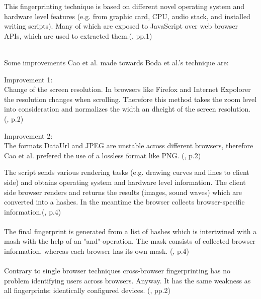 This fingerprinting technique is based on different novel operating system and hardware level features (e.g. from graphic card, CPU, audio stack, and installed writing scripts). Many of which are exposed to JavaScript over web browser APIs, which are used to extracted them.(\textcite{Cao17}, pp.1)\\\\

Some improvements Cao et al. made towards Boda et al.'s technique are:
\begin{tcolorbox}
	Improvement 1:\\
	Change of the screen resolution. In browsers like Firefox and Internet Expolorer the resolution changes when scrolling. Therefore this method takes the zoom level into consideration and normalizes the width an dheight of the screen resolution. (\textcite{Cao17}, p.2)
\end{tcolorbox}
\begin{tcolorbox}
	Improvement 2:\\
	The formats DataUrl and JPEG are unstable across different browsers, therefore Cao et al. prefered the use of a lossless format like PNG. (\textcite{Cao17}, p.2)
\end{tcolorbox}
The script sends various rendering tasks (e.g. drawing curves and lines to client side) and obtains operating system and hardware level information. The client side browser renders and returns the results (images, sound waves) which are converted into a hashes. In the meantime the browser collects browser-specific information.(\textcite{Cao17}, p.4)\\\\
The final fingerprint is generated from a list of hashes which is intertwined with a mash with the help of an "and"-operation. The mask consists of collected browser information, whereas each browser has its own mask. (\textcite{Cao17}, p.4)\\\\
Contrary to single browser techniques cross-browser fingerprinting has no problem identifying users across browsers. Anyway. It has the same weakness as all fingerprints: identically configured devices. (\textcite{upi15}, pp.2)

